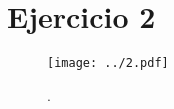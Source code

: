 \section*{Ejercicio 2}


\begin{figure}[htb!]
    \centering
    \texttt{[image: ../2.pdf]}
    \caption{.}
    \label{fig:02}
\end{figure}

